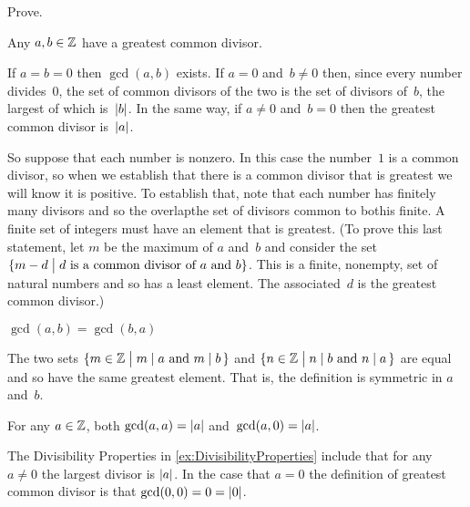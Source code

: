 \documentclass{ibl}  %
\begin{document}
\begin{problem}
Prove.
\begin{exes} 
\begin{exercise}  
   Any $a,b\in\mathbb{Z}$ have a greatest common divisor.
\end{exercise}
\begin{answer}
  If $a=b=0$ then $\gcd(a,b)$ exists. 
  If $a=0$ and~$b\neq 0$ then, since every number divides~$0$, the set of 
  common divisors of the two is the set of divisors of~$b$, 
  the largest of which is~$\lvert b\rvert$.
  In the same way, if $a\neq 0$ and~$b=0$ then the greatest common divisor 
  is~$\lvert a\rvert$.

  So suppose that each number is nonzero.
  In this case the number~$1$ is a common divisor, so when we establish that 
  there is a common divisor that is greatest we will know it is positive.
  To establish that, note that each number has finitely many divisors and
  so the overlap\Dash the set of divisors common to both\Dash is finite.
  A finite set of integers must have an element that is greatest.
  (To prove this last statement, let $m$ be the maximum of $a$ and~$b$
  and consider the set 
  $\{m-d \bigm| \text{$d$ is a common divisor of $a$ and~$b$}\}$.
  This is a finite, nonempty, set of natural numbers and so has a least element.
  The associated~$d$ is the greatest common divisor.)  
\end{answer}
\begin{exercise}  
  $\gcd(a,b)=\gcd(b,a)$
\end{exercise}
\begin{answer}
  The two sets 
  $\{m\in\mathbb{Z} \bigm| \text{$m\mid a$ and $m\mid b$\,}\}$
  and 
  $\{n\in\mathbb{Z} \bigm| \text{$n\mid b$ and $n\mid a$\,}\}$
  are equal and so have the same greatest element. 
  That is, the definition is symmetric in $a$ and~$b$.  
\end{answer}
\begin{exercise} 
  For any $a\in\mathbb{Z}$, both $\gcd(a,a)=\lvert a\rvert$ 
  and~$\gcd(a,0)=\lvert a\rvert$.
\end{exercise}
\begin{answer}
  The Divisibility Properties in \ref{ex:DivisibilityProperties}
  include that for any~$a\neq 0$ the largest divisor is $\lvert a\rvert$.
  In the case that $a=0$ the definition of greatest common divisor 
  is that $\gcd(0,0)=0=\lvert0\rvert$.


\end{answer}
\end{exes}
\end{problem}
\end{document}

